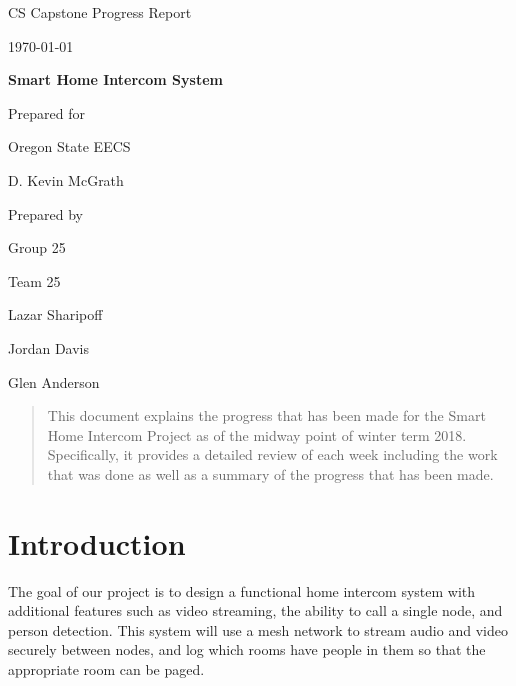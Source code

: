 \documentclass[onecolumn, draftclsnofoot,10pt, compsoc]{IEEEtran}
\def \CapstoneTeamName{		Team 25}
\def \CapstoneTeamNumber{		25}
\def \GroupMemberOne{			Lazar Sharipoff}
\def \GroupMemberTwo{			Jordan Davis}
\def \GroupMemberThree{			Glen Anderson}
\def \CapstoneProjectName{		Smart Home Intercom System}
\def \CapstoneSponsorCompany{	Oregon State EECS}
\def \CapstoneSponsorPerson{		D. Kevin McGrath}
\def \DocType{		%
				Progress Report
				}
\newcommand{\NameSigPair}[1]{\par
\makebox[2.75in][r]{#1} \hfil 	\makebox[3.25in]{\makebox[2.25in]{\hrulefill} \hfill		\makebox[.75in]{\hrulefill}}
\par\vspace{-12pt} \textit{\tiny\noindent
\makebox[2.75in]{} \hfil		\makebox[3.25in]{\makebox[2.25in][r]{Signature} \hfill	\makebox[.75in][r]{Date}}}}
\renewcommand{\NameSigPair}[1]{#1}
\begin{document}
\begin{titlepage}
\begin{singlespace}
\hfill
\par\vspace{.2in}
\centering
\scshape{
\huge CS Capstone \DocType \par
{\large\today}\par
\vspace{.5in}
\textbf{\Huge\CapstoneProjectName}\par
\vfill
{\large Prepared for}\par
\Huge \CapstoneSponsorCompany\par
\vspace{5pt}
{\Large\NameSigPair{\CapstoneSponsorPerson}\par}
{\large Prepared by }\par
Group\CapstoneTeamNumber\par
\CapstoneTeamName\par
\vspace{5pt}
{\Large
\NameSigPair{\GroupMemberOne}\par
\NameSigPair{\GroupMemberTwo}\par
\NameSigPair{\GroupMemberThree}\par
}
\vspace{20pt}
}
\begin{abstract}
	This document explains the progress that has been made for the Smart Home Intercom Project as of the midway point of winter term 2018. Specifically, it provides a detailed review of each week including the work that was done as well as a summary of the progress that has been made. 
\end{abstract}
\end{singlespace}
\end{titlepage}
\newpage
{}
\tableofcontents
\clearpage

\section{Introduction}
The goal of our project is to design a functional home intercom system with additional features such as video streaming, the ability to call a single node, and person detection. This system will use a mesh network to stream audio and video securely between nodes, and log which rooms have people in them so that the appropriate room can be paged. 
\end{document}
